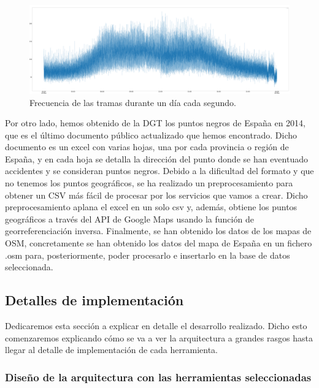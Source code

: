 \begin{figure}[htp]
\centering
\includegraphics[scale=0.28]{Imagenes/graf3.png}
\caption{ Frecuencia de las tramas durante un día cada segundo.}
\label{graf1sec}
\end{figure}

Por otro lado, hemos obtenido de la DGT los puntos negros de España en 2014, que es el último documento público actualizado que hemos encontrado. Dicho documento es un excel con varias hojas, una por cada provincia o región de España, y en cada hoja se detalla la dirección del punto donde se han eventuado accidentes y se consideran puntos negros. Debido a la dificultad del formato y que no tenemos los puntos geográficos, se ha realizado un preprocesamiento para obtener un CSV más fácil de procesar por los servicios que vamos a crear. Dicho preprocesamiento aplana el excel en un solo csv y, además, obtiene los puntos geográficos a través del API de Google Maps usando la función de georreferenciación inversa.
Finalmente, se han obtenido los datos de los mapas de OSM, concretamente se han obtenido los datos del mapa de España en un fichero .osm para, posteriormente, poder procesarlo e insertarlo en la base de datos seleccionada.

\subsection{Detalles de implementación\label{implementacion}}

Dedicaremos esta sección a explicar en detalle el desarrollo realizado. Dicho esto comenzaremos explicando cómo se va a ver la arquitectura a grandes rasgos hasta llegar al detalle de implementación de cada herramienta.

\subsubsection{Diseño de la arquitectura con las herramientas seleccionadas\label{disenio}}

